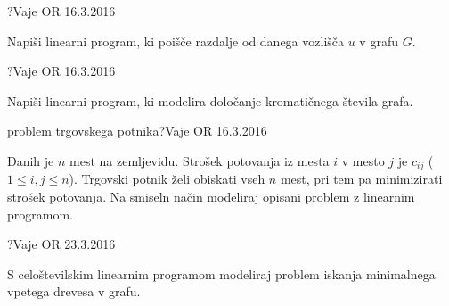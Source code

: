 \begin{naloga}{}{?}{Vaje OR 16.3.2016}
\begin{vprasanje}
Napiši linearni program,
ki poišče razdalje od danega vozlišča $u$ v grafu $G$.
\end{vprasanje}
\begin{odgovor}
\end{odgovor}
\end{naloga}


\begin{naloga}{}{?}{Vaje OR 16.3.2016}
\begin{vprasanje}
Napiši linearni program,
ki modelira določanje kromatičnega števila grafa.

\end{vprasanje}
\begin{odgovor}
\end{odgovor}
\end{naloga}


\begin{naloga}{problem trgovskega potnika}{?}{Vaje OR 16.3.2016}
\begin{vprasanje}
Danih je $n$ mest na zemljevidu.
Strošek potovanja iz mesta $i$ v mesto $j$ je $c_{ij}$ ($1 \le i, j \le n$).
Trgovski potnik želi obiskati vseh $n$ mest,
pri tem pa minimizirati strošek potovanja.
Na smiseln način modeliraj opisani problem z linearnim programom.
\end{vprasanje}
\begin{odgovor}
\end{odgovor}
\end{naloga}


\begin{naloga}{}{?}{Vaje OR 23.3.2016}
\begin{vprasanje}
S celoštevilskim linearnim programom
modeliraj problem iskanja minimalnega vpetega drevesa v grafu.
\end{vprasanje}
\begin{odgovor}
\end{odgovor}
\end{naloga}
